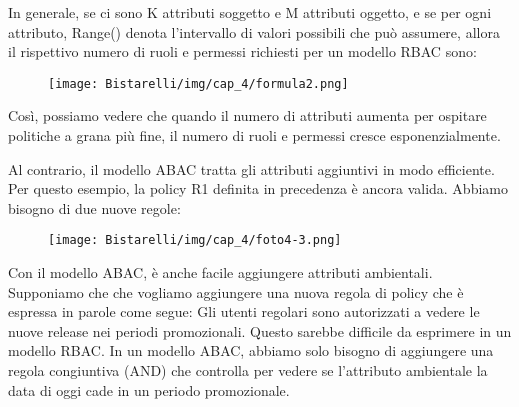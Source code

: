 In generale, se ci sono K attributi soggetto e M attributi oggetto, e se per ogni attributo, Range() denota l'intervallo di valori possibili che può assumere, allora il rispettivo numero di ruoli e permessi richiesti per un modello RBAC sono:

\begin{figure}[H]
	\centering
    \texttt{[image: Bistarelli/img/cap\_4/formula2.png]}
\end{figure}

Così, possiamo vedere che quando il numero di attributi aumenta per ospitare politiche a grana più fine, il numero di ruoli e permessi cresce esponenzialmente.

Al contrario, il modello ABAC tratta gli attributi aggiuntivi in modo efficiente. Per questo esempio, la policy R1 definita in precedenza è ancora valida. Abbiamo bisogno di due nuove regole:

\begin{figure}[H]
	\centering
    \texttt{[image: Bistarelli/img/cap\_4/foto4-3.png]}
\end{figure}

Con il modello ABAC, è anche facile aggiungere attributi ambientali. Supponiamo che che vogliamo aggiungere una nuova regola di policy che è espressa in parole come segue: Gli utenti regolari sono autorizzati a vedere le nuove release nei periodi promozionali. Questo sarebbe difficile da esprimere in un modello RBAC. In un modello ABAC, abbiamo solo bisogno di aggiungere una regola congiuntiva (AND) che controlla per vedere se l'attributo ambientale la data di oggi cade in un periodo promozionale.
\newpage
